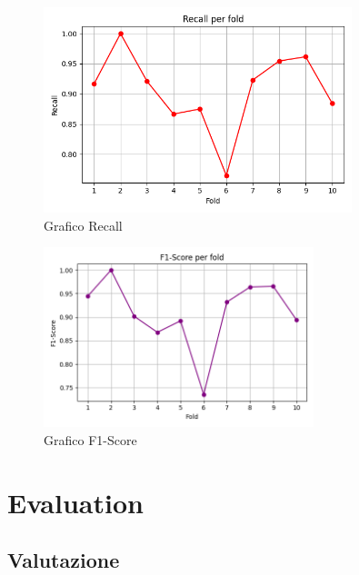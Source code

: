 \documentclass[a4paper,12pt]{report}
\begin{document}
\vspace*{\fill}
\begin{figure}[h]
\centering
\includegraphics[width=0.8\textwidth]{recall.png}
\caption{Grafico Recall}
\end{figure}
\hfill \break
\begin{figure}[h]
\centering
\includegraphics[width=0.7\textwidth]{f1score.png}
\caption{Grafico F1-Score}
\end{figure}
\vspace*{\fill}
\hfill \break
\newpage

\begingroup%
\makeatletter%
\let\clearpage\relax%
\vspace*{\fill}%
\vspace*{\dimexpr-50\p@-\baselineskip}%
\chapter{Evaluation}
\vspace*{\fill}%
\endgroup
\newpage

\section{Valutazione}
\end{document}
